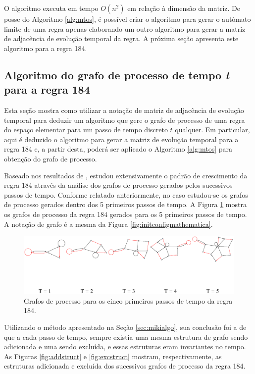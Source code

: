 \documentclass[12pt,a4paper]{article}
\begin{document}
O algoritmo executa em tempo $O(n^2)$ em relação à dimensão da matriz.
De posse do Algoritmo \ref{alg:mtos}, é possível criar o algoritmo para gerar o
autômato limite de uma regra apenas elaborando um outro algoritmo para gerar a
matriz de adjacência de evolução temporal da regra. A próxima seção apresenta este
algoritmo para a regra 184.

\subsection{Algoritmo do grafo de processo de tempo \emph{t} para a regra 184}\label{sec:184}

Esta seção mostra como utilizar a notação de matriz de adjacência
de evolução temporal para deduzir um algoritmo que gere o grafo de processo de uma
regra do espaço elementar para um passo de tempo discreto $t$ qualquer. Em
particular, aqui é deduzido o algoritmo para gerar a matriz de evolução temporal para
a regra 184 e, a partir desta, poderá ser aplicado o Algoritmo \ref{alg:mtos}
para obtenção do grafo de processo.

Baseado nos resultados de , 
estudou extensivamente o padrão de crescimento da regra 184 através da análise
dos grafos de processo gerados pelos sucessivos passos de tempo.
Conforme relatado anteriormente, no caso estudou-se
os grafos de processo gerados dentro dos 5 primeiros passos de tempo. A Figura
\ref{fig:184-5t} mostra os grafos de processo da regra 184 gerados para os 5
primeiros passos de tempo. A notação de grafo é a mesma da Figura
\ref{fig:initconfigmathematica}.

\begin{figure}[htp]
\begin{center}
\includegraphics[scale=0.7]{img/184_5t.eps}
\caption{Grafos de processo para os cinco primeiros passos de tempo da regra 184.}
\label{fig:184-5t}
\end{center}
\end{figure}

Utilizando o método apresentado na Seção \ref{sec:mikialgo}, sua conclusão
foi a de que a cada passo de tempo, sempre existia uma mesma estrutura
de grafo sendo adicionada e uma sendo excluída, e essas estruturas eram
invariantes no tempo. As Figuras \ref{fig:addstruct} e \ref{fig:excstruct}
mostram, respectivamente, as estruturas adicionada e excluída dos sucessivos
grafos de processo da regra 184.
\end{document}
